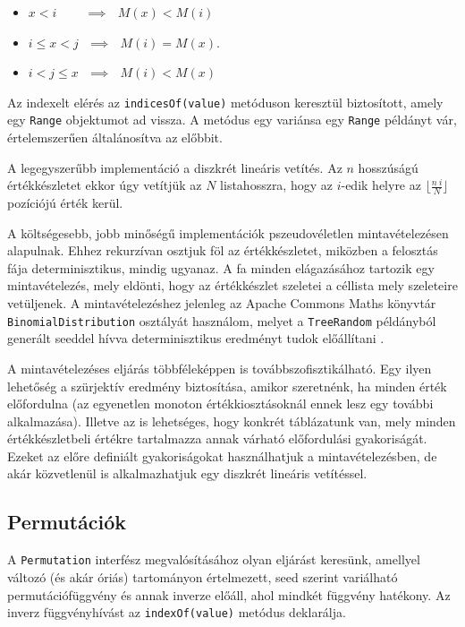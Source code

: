 \documentclass[
    parspace,
    noindent,
    nohyp,
]{elteiktdk}[2023/04/10]
\begin{document}
\begin{itemize}
\item $x < i ~~~~~~~~~~ \implies ~~~ M(x) < M(i)$
\item $i \leq x < j ~~~ \implies ~~~ M(i) = M(x)$.
\item $i < j \leq x ~~~ \implies ~~~ M(i) < M(x)$
\end{itemize}

Az indexelt elérés az \texttt{indicesOf(value)} metóduson keresztül biztosított, amely egy \texttt{Range} objektumot ad vissza.
A metódus egy variánsa egy \texttt{Range} példányt vár, értelemszerűen általánosítva az előbbit.

A legegyszerűbb implementáció a diszkrét lineáris vetítés.
Az $n$ hosszúságú értékkészletet ekkor úgy vetítjük az $N$ listahosszra,
hogy az $i$-edik helyre az $\lfloor \frac{n~i}{N} \rfloor$ pozíciójú érték kerül.

A költségesebb, jobb minőségű implementációk pszeudovéletlen mintavételezésen alapulnak.
Ehhez rekurzívan osztjuk föl az értékkészletet, miközben a felosztás fája determinisztikus, mindig ugyanaz.
A fa minden elágazásához tartozik egy mintavételezés, mely eldönti,
hogy az értékkészlet szeletei a céllista mely szeleteire vetüljenek.
A mintavételezéshez jelenleg az Apache Commons Maths könyvtár
\texttt{BinomialDistribution} osztályát használom,
melyet a \texttt{TreeRandom} példányból generált seeddel hívva
determinisztikus eredményt tudok előállítani%
\cite{SoftwareApacheCommonsMath}.

A mintavételezéses eljárás többféleképpen is továbbszofisztikálható.
Egy ilyen lehetőség a szürjektív eredmény biztosítása, amikor szeretnénk, ha minden érték előfordulna
(az egyenetlen monoton értékkiosztásoknál ennek lesz egy további alkalmazása).
Illetve az is lehetséges, hogy konkrét táblázatunk van,
mely minden értékkészletbeli értékre tartalmazza annak várható előfordulási gyakoriságát.
Ezeket az előre definiált gyakoriságokat használhatjuk a mintavételezésben,
de akár közvetlenül is alkalmazhatjuk egy diszkrét lineáris vetítéssel.

\subsection{Permutációk}

A \texttt{Permutation} interfész megvalósításához olyan eljárást keresünk, amellyel változó (és akár óriás) tartományon értelmezett,
seed szerint variálható permutációfüggvény és annak inverze előáll, ahol mindkét függvény hatékony.
Az inverz függvényhívást az \texttt{indexOf(value)} metódus deklarálja.
\end{document}
